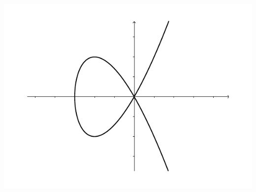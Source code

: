 \documentclass[12pt]{article}
\begin{document}
\begin{enumerate}
\begin{multicols}{2}
\begin{center}
\includegraphics[width=\columnwidth]{TT3_fig2}
\end{center}
\end{multicols}
\end{enumerate}
\end{document}
